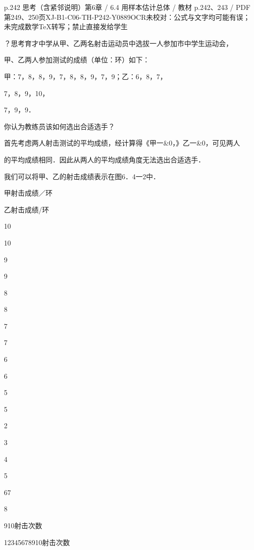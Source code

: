 \begin{bankitem}{p.242 思考（含紧邻说明）}{第6章 / 6.4 用样本估计总体 / 教材 p.242、243 / PDF 第249、250页}{XJ-B1-C06-TH-P242-Y0889}{OCR未校对：公式与文字均可能有误；未完成数学TeX转写；禁止直接发给学生}
\begin{ocrdraft}
\par
？思考育才中学从甲、乙两名射击运动员中选拔一人参加市中学生运动会，
\par
甲、乙两人参加测试的成绩（单位：环）如下：
\par
甲：7，8，8，9，7，8，8，9，7，9；乙：6，8，7，
\par
7，8，9，10，
\par
7，9，9．
\par
你认为教练员该如何选出合适选手？
\par
首先考虑两人射击测试的平均成绩，经计算得《甲一\&0，》乙一\&0，可见两人
\par
的平均成绩相同．因此从两人的平均成绩角度无法选出合适选手．
\par
我们可以将甲、乙的射击成绩表示在图6．4一2中．
\par
甲射击成绩／环
\par
乙射击成绩/环
\par
10
\par
10
\par
9
\par
9
\par
8
\par
8
\par
7
\par
7
\par
6
\par
6
\par
5
\par
5
\par
2
\par
3
\par
4
\par
5
\par
67
\par
8
\par
910射击次数
\par
12345678910射击次数

\end{ocrdraft}
\end{bankitem}
